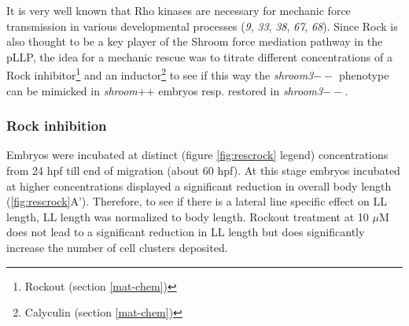 \documentclass[11pt,singlespacinge,twoside]{reedthesis} %
\begin{document}
It is very well known that Rho kinases are necessary for mechanic force transmission in various developmental processes (\emph{9}, \emph{33}, \emph{38}, \emph{67}, \emph{68}). Since Rock is also thought to be a key player of the Shroom force mediation pathway in the pLLP, the idea for a mechanic rescue was to titrate different concentrations of a Rock inhibitor\footnote{Rockout (section \ref{mat-chem})} and an inductor\footnote{Calyculin (section \ref{mat-chem})} to see if this way the \emph{shroom3}\(--\) phenotype can be mimicked in \emph{shroom}++ embryos resp. restored in \emph{shroom3}\(--\).

\hypertarget{rock-inhibition}{%
\subsubsection{Rock inhibition}\label{rock-inhibition}}

Embryos were incubated at distinct (figure \ref{fig:rescrock} legend) concentrations from 24 hpf till end of migration (about 60 hpf). At this stage embryos incubated at higher concentrations displayed a significant reduction in overall body length (\ref{fig:rescrock}A'). Therefore, to see if there is a lateral line specific effect on LL length, LL length was normalized to body length. Rockout treatment at 10 \(\mu\)M does not lead to a significant reduction in LL length but does significantly increase the number of cell clusters deposited.\newline
\end{document}

